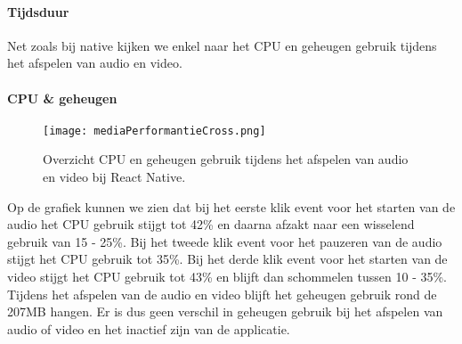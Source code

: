 \paragraph{Tijdsduur}
Net zoals bij native kijken we enkel naar het CPU en geheugen gebruik tijdens 
het afspelen van audio en video.

\paragraph{CPU \& geheugen}
\begin{figure}[H]
    \centering
    \texttt{[image: mediaPerformantieCross.png]}
    \caption{Overzicht CPU en geheugen gebruik tijdens het afspelen van audio en video bij React Native.}
\end{figure}
Op de grafiek kunnen we zien dat bij het eerste klik event voor het starten van de audio het 
CPU gebruik stijgt tot 42\% en daarna afzakt naar een wisselend gebruik van 15 - 25\%. Bij het
tweede klik event voor het pauzeren van de audio stijgt het CPU gebruik tot 35\%. 
Bij het derde klik event voor het starten van de video stijgt het CPU gebruik tot 43\% en 
blijft dan schommelen tussen 10 - 35\%. Tijdens het afspelen van de audio en video blijft 
het geheugen gebruik rond de 207MB hangen. Er is dus geen verschil in
geheugen gebruik bij het afspelen van audio of video en het inactief zijn van de applicatie.
